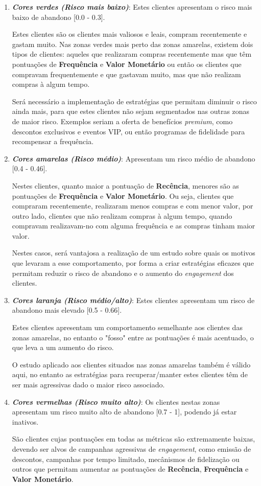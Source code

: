 \documentclass{easychair}
\begin{document}
\begin{enumerate}
	\item \textit{\textbf{Cores verdes (Risco mais baixo)}}: Estes clientes apresentam o risco mais baixo de abandono [0.0 - 0.3].

Estes clientes são os clientes mais valiosos e leais, compram recentemente e gastam muito. Nas zonas verdes mais perto das zonas amarelas, existem dois tipos de clientes: aqueles que realizaram compras recentemente mas que têm pontuações de \textbf{Frequência} e \textbf{Valor Monetário} ou então os clientes que compravam frequentemente e que gastavam muito, mas que não realizam compras à algum tempo.

Será necessário a implementação de estratégias que permitam diminuir o risco ainda mais, para que estes clientes não sejam segmentados nas outras zonas de maior risco. Exemplos seriam a oferta de benefícios \textit{premium}, como descontos exclusivos e eventos VIP, ou então programas de fidelidade para recompensar a frequência.
	\item \textit{\textbf{Cores amarelas (Risco médio)}}: Apresentam um risco médio de abandono [0.4 - 0.46].

Nestes clientes, quanto maior a pontuação de \textbf{Recência}, menores são as pontuações de \textbf{Frequência} e \textbf{Valor Monetário}. Ou seja, clientes que compraram recentemente, realizaram menos compras e com menor valor, por outro lado, clientes que não realizam compras à algum tempo, quando compravam realizavam-no com alguma frequência e as compras tinham maior valor.

Nestes casos, será vantajosa a realização de um estudo sobre quais os motivos que levaram a esse comportamento, por forma a criar estratégias eficazes que permitam reduzir o risco de abandono e o aumento do \textit{engagement} dos clientes.
	\item \textit{\textbf{Cores laranja (Risco médio/alto)}}: Estes clientes apresentam um risco de abandono mais elevado [0.5 - 0.66].

Estes clientes apresentam um comportamento semelhante aos clientes das zonas amarelas, no entanto o "fosso" entre as pontuações é mais acentuado, o que leva a um aumento do risco.

O estudo aplicado aos clientes situados nas zonas amarelas também é válido aqui, no entanto as estratégias para recuperar/manter estes clientes têm de ser mais agressivas dado o maior risco associado.
	\item \textit{\textbf{Cores vermelhas (Risco muito alto)}}: Os clientes nestas zonas apresentam um risco muito alto de abandono [0.7 - 1], podendo já estar inativos.

São clientes cujas pontuações em todas as métricas são extremamente baixas, devendo ser alvos de campanhas agressivas de \textit{engagement}, como emissão de descontos, campanhas por tempo limitado, mecânismos de fidelização ou outros que permitam aumentar as pontuações de \textbf{Recência}, \textbf{Frequência} e  \textbf{Valor Monetário}.
\end{enumerate}
\end{document}
